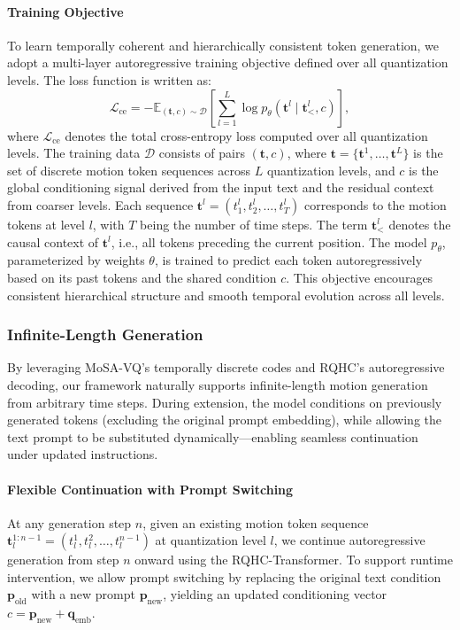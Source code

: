 \documentclass[a4paper,12pt]{article}
\begin{document}
\paragraph{Training Objective}
To learn temporally coherent and hierarchically consistent token generation, we adopt a multi-layer autoregressive training objective defined over all quantization levels. The loss function is written as:
\begin{equation}
\mathcal{L}_{\text{ce}} = -\mathbb{E}_{(\mathbf{t}, c) \sim \mathcal{D}} \left[ \sum_{l=1}^{L} \log p_\theta(\mathbf{t}^l \mid \mathbf{t}_{<}^l, c) \right],
\end{equation}
where \( \mathcal{L}_{\text{ce}} \) denotes the total cross-entropy loss computed over all quantization levels. The training data \( \mathcal{D} \) consists of pairs \((\mathbf{t}, c)\), where \( \mathbf{t} = \{ \mathbf{t}^1, \ldots, \mathbf{t}^L \} \) is the set of discrete motion token sequences across \(L\) quantization levels, and \( c \) is the global conditioning signal derived from the input text and the residual context from coarser levels. Each sequence \( \mathbf{t}^l = (t_1^l, t_2^l, \ldots, t_T^l) \) corresponds to the motion tokens at level \( l \), with \( T \) being the number of time steps. The term \( \mathbf{t}_{<}^l \) denotes the causal context of \( \mathbf{t}^l \), i.e., all tokens preceding the current position. The model \( p_\theta \), parameterized by weights \( \theta \), is trained to predict each token autoregressively based on its past tokens and the shared condition \( c \). This objective encourages consistent hierarchical structure and smooth temporal evolution across all levels.


\subsubsection{Infinite-Length Generation}
\label{sec:infinitegen}
By leveraging MoSA-VQ’s temporally discrete codes and RQHC’s autoregressive decoding, our framework naturally supports infinite-length motion generation from arbitrary time steps. During extension, the model conditions on previously generated tokens (excluding the original prompt embedding), while allowing the text prompt to be substituted dynamically—enabling seamless continuation under updated instructions.

\paragraph{Flexible Continuation with Prompt Switching}
At any generation step \( n \), given an existing motion token sequence \( \mathbf{t}_l^{1:n-1} = (t_l^1, t_l^2, \ldots, t_l^{n-1}) \) at quantization level \( l \), we continue autoregressive generation from step \( n \) onward using the RQHC-Transformer. To support runtime intervention, we allow prompt switching by replacing the original text condition \( \mathbf{p}_{\text{old}} \) with a new prompt \( \mathbf{p}_{\text{new}} \), yielding an updated conditioning vector \( c = \mathbf{p}_{\text{new}} + \mathbf{q}_{\text{emb}} \).
\end{document}
